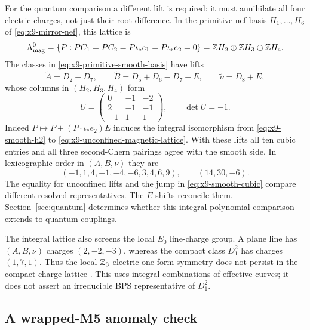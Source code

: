 For the quantum comparison a different lift is required: it must
annihilate all four electric charges, not just their root difference.
In the primitive nef basis $H_1,\ldots,H_6$ of
\eqref{eq:x9-mirror-nef}, this lattice is
\begin{equation}
 \Lambda^0_{\rm mag}
 =\{P:P C_1=P C_2=P\iota_*e_1=P\iota_*e_2=0\}
 =\mathbb Z H_2\oplus\mathbb Z H_3\oplus\mathbb Z H_4.
 \label{eq:x9-unconfined-magnetic-lattice}
\end{equation}
The classes in \eqref{eq:x9-primitive-smooth-basis} have lifts
\begin{equation}
 \widetilde A=D_2+D_7,\qquad
 \widetilde B=D_5+D_6-D_7+E,\qquad \widetilde\nu=D_8+E,
 \label{eq:x9-unconfined-lifts}
\end{equation}
whose columns in $(H_2,H_3,H_4)$ form
\begin{equation}
 U=\begin{pmatrix}0&-1&-2\\2&-1&-1\\-1&1&1\end{pmatrix},\qquad \det U=-1.
 \label{eq:x9-unconfined-unimodular}
\end{equation}
Indeed $P\mapsto P+(P\cdot\iota_*e_2)E$ induces the integral
isomorphism from \eqref{eq:x9-smooth-h2} to
\eqref{eq:x9-unconfined-magnetic-lattice}. With these lifts all ten
cubic entries and all three second-Chern pairings agree with the
smooth side. In lexicographic order in $(A,B,\nu)$ they are
\begin{equation}
 (-1,1,4,-1,-4,-6,3,4,6,9),\qquad (14,30,-6).
 \label{eq:x9-primitive-cubic}
\end{equation}
The equality for unconfined lifts and the jump in
\eqref{eq:x9-smooth-cubic} compare different resolved representatives.
The $E$ shifts reconcile them. Section~\ref{sec:quantum} determines
whether this integral polynomial comparison extends to quantum couplings.

The integral lattice also screens the local $E_0$ line-charge group.
A plane line has $(A,B,\nu)$ charges $(2,-2,-3)$, whereas the compact
class $D_1^2$ has charges $(1,7,1)$. Thus the local $\mathbb Z_3$ electric
one-form symmetry does not persist in the compact charge lattice
\cite[Sections~3.4 and~5.3]{Morrison:2020ool}. This uses integral
combinations of effective curves; it does not assert an irreducible
BPS representative of $D_1^2$.

\subsection{A wrapped-M5 anomaly check}
\label{subsec:x9-m5-anomaly}

